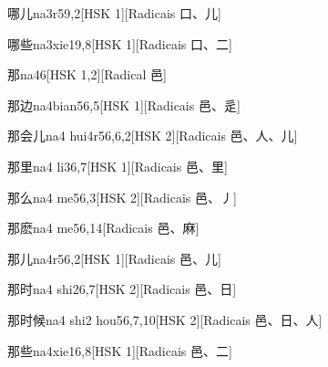 \begin{entry}{哪儿}{na3r5}{9,2}[HSK 1][Radicais ⼝、⼉]
\end{entry}

\begin{entry}{哪些}{na3xie1}{9,8}[HSK 1][Radicais ⼝、⼆]
\end{entry}

\begin{entry}{那}{na4}{6}[HSK 1,2][Radical ⾢]
\end{entry}

\begin{entry}{那边}{na4bian5}{6,5}[HSK 1][Radicais ⾢、⾡]
\end{entry}

\begin{entry}{那会儿}{na4 hui4r5}{6,6,2}[HSK 2][Radicais ⾢、⼈、⼉]
\end{entry}

\begin{entry}{那里}{na4 li3}{6,7}[HSK 1][Radicais ⾢、⾥]
\end{entry}

\begin{entry}{那么}{na4 me5}{6,3}[HSK 2][Radicais ⾢、⼃]
\end{entry}

\begin{entry}{那麽}{na4 me5}{6,14}[Radicais ⾢、⿇]
\end{entry}

\begin{entry}{那儿}{na4r5}{6,2}[HSK 1][Radicais ⾢、⼉]
\end{entry}

\begin{entry}{那时}{na4 shi2}{6,7}[HSK 2][Radicais ⾢、⽇]
\end{entry}

\begin{entry}{那时候}{na4 shi2 hou5}{6,7,10}[HSK 2][Radicais ⾢、⽇、⼈]
\end{entry}

\begin{entry}{那些}{na4xie1}{6,8}[HSK 1][Radicais ⾢、⼆]
\end{entry}

